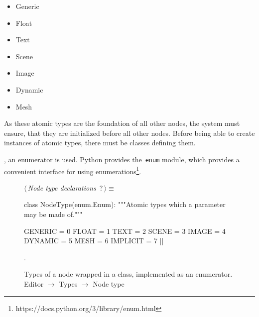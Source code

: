\documentclass[%
    a4paper,    %
    justified,  %
    nobib,      %
    openany     %
]{tufte-book}
\begin{document}
\begin{itemize}
  \item{Generic}
  \item{Float}
  \item{Text}
  \item{Scene}
  \item{Image}
  \item{Dynamic}
  \item{Mesh}
\end{itemize}

As these atomic types are the foundation of all other nodes, the system must
ensure, that they are initialized before all other nodes. Before being able to
create instances of atomic types, there must be classes defining them.

, an enumerator is used.
Python provides the~\verb=enum= module, which provides a convenient interface
for using enumerations\footnote{https://docs.python.org/3/library/enum.html}.

\begin{figure}
\begin{flushleft} \small
\begin{minipage}{\linewidth}\label{scrap63}\raggedright\small
{} $\langle\,${\itshape Node type declarations}\nobreak\ {\footnotesize {?}}$\,\rangle\equiv$
\vspace{-1ex}
\begin{pythoncode}
class NodeType(enum.Enum):
    """Atomic types which a parameter may be made of."""

    GENERIC  = 0
    FLOAT    = 1
    TEXT     = 2
    SCENE    = 3
    IMAGE    = 4
    DYNAMIC  = 5
    MESH     = 6
    IMPLICIT = 7
|\NWsep|
\end{pythoncode}
\vspace{1.5ex}
\footnotesize
\begin{list}{}{\setlength{\itemsep}{-\parsep}\setlength{\itemindent}{-\leftmargin}}
\item {\NWtxtMacroNoRef}.

\item{}
\end{list}
\end{minipage}\vspace{4ex}
\end{flushleft}
\caption{Types of a node wrapped in a class, implemented as an enumerator.
  \newline{}\newline{}Editor $\rightarrow$ Types $\rightarrow$ Node type}
\label{editor:lst:types:node-type}
\end{figure}
\end{document}
